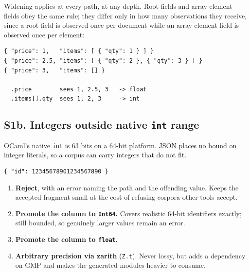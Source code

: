 Widening applies at every path, at any depth. Root fields and array-element
fields obey the same rule; they differ only in how many observations they
receive, since a root field is observed once per document while an
array-element field is observed once per element:

\begin{lstlisting}[style=json]
{ "price": 1,   "items": [ { "qty": 1 } ] }
{ "price": 2.5, "items": [ { "qty": 2 }, { "qty": 3 } ] }
{ "price": 3,   "items": [] }

  .price        sees 1, 2.5, 3   -> float
  .items[].qty  sees 1, 2, 3     -> int
\end{lstlisting}



\subsection*{S1b. Integers outside native \texttt{int} range}

OCaml's native \texttt{int} is 63 bits on a 64-bit platform. JSON places no
bound on integer literals, so a corpus can carry integers that do not fit.

\begin{lstlisting}[style=json]
{ "id": 12345678901234567890 }
\end{lstlisting}

\options
\begin{enumerate}[label=\textbf{(\alph*)}]
  \item \textbf{Reject}, with an error naming the path and the offending
        value. Keeps the accepted fragment small at the cost of refusing
        corpora other tools accept.
  \item \textbf{Promote the column to \texttt{Int64}.} Covers realistic
        64-bit identifiers exactly; still bounded, so genuinely larger values
        remain an error.
  \item \textbf{Promote the column to \texttt{float}.} \selected
  \item \textbf{Arbitrary precision via zarith} (\texttt{Z.t}). Never lossy,
        but adds a dependency on GMP and makes the generated modules heavier
        to consume.
\end{enumerate}

